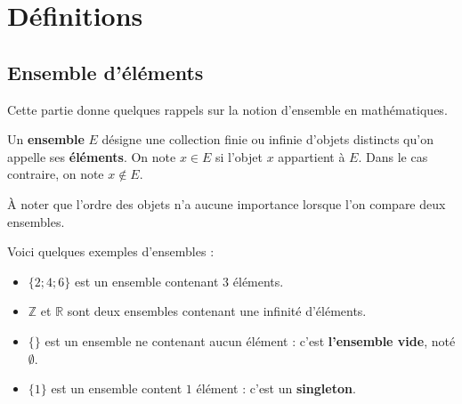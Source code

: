






	\section{Définitions}

	\subsection{Ensemble d'éléments}

	Cette partie donne quelques rappels sur la notion d'ensemble en mathématiques.

	\begin{formula}[Définition]
		Un \textbf{ensemble} $E$ désigne une collection finie ou infinie d'objets distincts qu'on appelle ses \textbf{éléments}.
		\newpar
		On note $x \in E$ si l'objet $x$ appartient à $E$. Dans le cas contraire, on note $x \notin E$.
	\end{formula}

	À noter que l'ordre des objets n'a aucune importance lorsque l'on compare deux ensembles.

	\begin{tip}[Exemple]
		Voici quelques exemples d'ensembles :
		\begin{itemize}
			\item $\{2; 4; 6\}$ est un ensemble contenant $3$ éléments.
			\item $\mathbb{Z}$ et $\mathbb{R}$ sont deux ensembles contenant une infinité d'éléments.
			\item $\{\}$ est un ensemble ne contenant aucun élément : c'est \textbf{l'ensemble vide}, noté $\emptyset$.
			\item $\{1\}$ est un ensemble content $1$ élément : c'est un \textbf{singleton}.
		\end{itemize}
	\end{tip}

